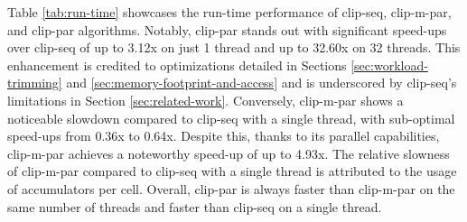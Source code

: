 \documentclass{egpubl}
\begin{document}
Table \ref{tab:run-time} showcases the run-time performance of clip-seq, clip-m-par, and clip-par algorithms. Notably, clip-par stands out with significant speed-ups over clip-seq of up to 3.12x on just 1 thread and up to 32.60x on 32 threads. This enhancement is credited to optimizations detailed in Sections \ref{sec:workload-trimming} and \ref{sec:memory-footprint-and-access} and is underscored by clip-seq's limitations in Section \ref{sec:related-work}. Conversely, clip-m-par shows a noticeable slowdown compared to clip-seq with a single thread, with sub-optimal speed-ups from 0.36x to 0.64x. Despite this, thanks to its parallel capabilities, clip-m-par achieves a noteworthy speed-up of up to 4.93x. The relative slowness of clip-m-par compared to clip-seq with a single thread is attributed to the usage of accumulators per cell. Overall, clip-par is always faster than clip-m-par on the same number of threads and faster than clip-seq on a single thread.
\end{document}
